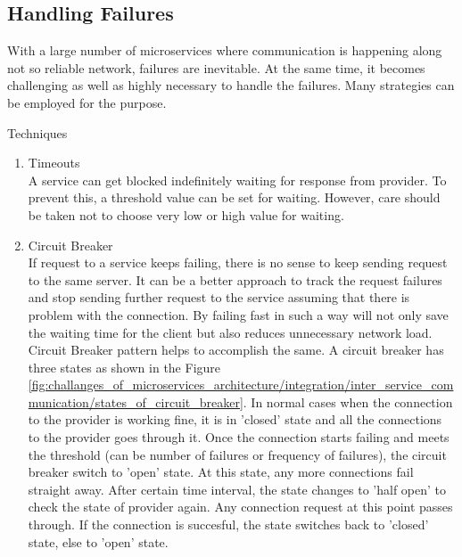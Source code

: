 \subsection{Handling Failures}\label{section:challanges_of_microservices_architecture/handling_failures}
With a large number of microservices where communication is happening along not so reliable network, failures are inevitable. At the same time, it becomes challenging as well as highly necessary to handle the failures. Many strategies can be employed for the purpose. \cite{Newman:2015aa}\cite{Richardson:2015ab}\cite{Nygard:2007aa}
\begin{shaded}Techniques\end{shaded}
\begin{enumerate}
\item Timeouts \\ A service can get blocked indefinitely waiting for response from provider. To prevent this, a threshold value can be set for waiting. However, care should be taken not to choose very low or high value for waiting. 
\item Circuit Breaker \\ If request to a service keeps failing, there is no sense to keep sending request to the same server. It can be a better approach to track the request failures and stop sending further request to the service assuming that there is problem with the connection. By failing fast in such a way will not only save the waiting time for the client but also reduces unnecessary network load. Circuit Breaker pattern helps to accomplish the same. A circuit breaker has three states as shown in the Figure \ref{fig:challanges_of_microservices_architecture/integration/inter_service_communication/states_of_circuit_breaker}. In normal cases when the connection to the provider is working fine, it is in 'closed' state and all the connections to the provider goes through it. Once the connection starts failing and meets the threshold (can be number of failures or frequency of failures), the circuit breaker switch to 'open' state. At this state, any more connections fail straight away. After certain time interval, the state changes to 'half open' to check the state of provider again. Any connection request at this point passes through. If the connection is succesful, the state switches back to 'closed' state, else to 'open' state.\cite{Fowler:2014ac} \cite{Newman:2015aa} \cite{Nygard:2007aa}
\begin{figure}[H]
\begin{center}

\end{center}
\end{figure}
\end{enumerate}
